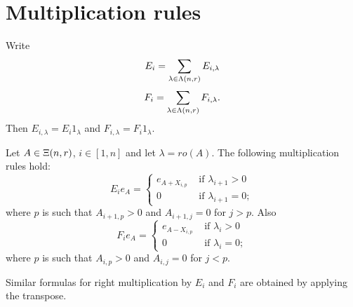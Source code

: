 \documentclass[a4paper, 11pt]{report}
\begin{document}
\section{Multiplication rules}

Write
\begin{equation*}
E_i = \sum_{\lambda\in\Lambda(n,r)} E_{i,\lambda}
\end{equation*}
\begin{equation*}
F_i = \sum_{\lambda\in\Lambda(n,r)} F_{i,\lambda}.
\end{equation*}
Then $E_{i,\lambda} = E_i 1_\lambda$ and $F_{i,\lambda} = F_i 1_\lambda$.

\begin{lemma}
Let $A\in\Xi(n,r)$, $i\in [1,n]$ and let $\lambda = ro(A)$. The following multiplication rules hold:
\begin{equation*}
E_i e_A = \begin{cases}
e_{A+X_{i,p}} &\text{	if } \lambda_{i+1}>0\\
0 &\text{	if } \lambda_{i+1}=0;
\end{cases}
\end{equation*}
where $p$ is such that $A_{i+1,p}>0$ and $A_{i+1,j}=0$ for $j>p$. Also
\begin{equation*}
F_i e_A = \begin{cases}
e_{A-X_{i,p}} &\text{	if } \lambda_i>0\\
0 &\text{	if } \lambda_i=0;
\end{cases}
\end{equation*}
where $p$ is such that $A_{i,p}>0$ and $A_{i,j}=0$ for $j<p$.
\end{lemma}

Similar formulas for right multiplication by $E_i$ and $F_i$ are obtained by applying the transpose.
\end{document}
